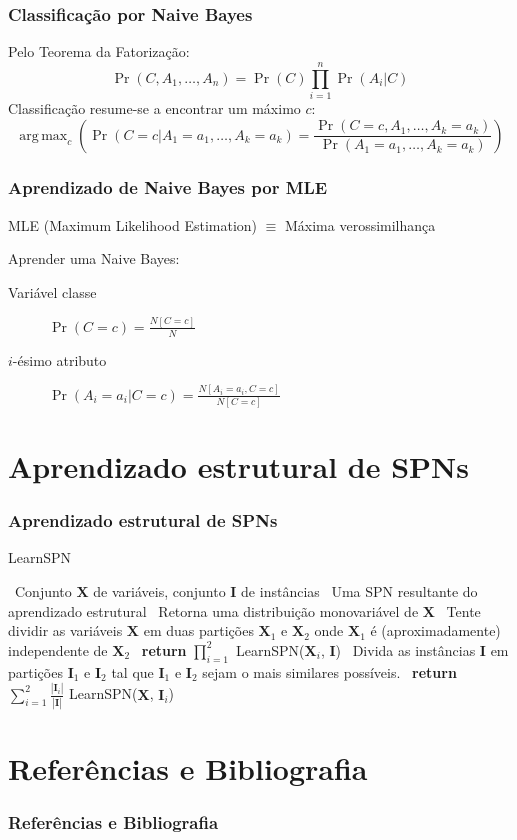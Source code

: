 \documentclass[10pt]{beamer}
\DeclareMathOperator*{\argmax}{arg\,max}
\theoremstyle{plain}
\newcommand{\set}[1]{\mathbf{#1}}
\begin{document}
\begin{frame}
  \frametitle{Classificação por Naive Bayes}
  Pelo Teorema da Fatorização:
  \begin{equation*}
    \Pr(C,A_1,\ldots,A_n)=\Pr(C)\prod_{i=1}^n \Pr(A_i|C)
  \end{equation*}
  Classificação resume-se a encontrar um máximo $c$:
  \begin{equation*}
    \argmax_c\left(\Pr(C=c|A_1=a_1,\ldots,A_k=a_k)=\frac{\Pr(C=c,A_1,\ldots,A_k=a_k)}{\Pr(A_1=a_1,
    \ldots,A_k=a_k)}\right)
  \end{equation*}
\end{frame}

\begin{frame}
  \frametitle{Aprendizado de Naive Bayes por MLE}
  MLE (Maximum Likelihood Estimation) $\equiv$ Máxima verossimilhança

  Aprender uma Naive Bayes:
  \begin{description}
    \item[Variável classe] $\Pr(C=c)=\frac{N[C=c]}{N}$
    \item[$i$-ésimo atributo] $\Pr(A_i=a_i|C=c)=\frac{N[A_i=a_i,C=c]}{N[C=c]}$
  \end{description}
\end{frame}


\section{Aprendizado estrutural de SPNs}

\begin{frame}
  \frametitle{Aprendizado estrutural de SPNs}
  \begin{algorithm}[H]
    \caption{LearnSPN~\cite{gens-domingos}}\label{learn-alg}
    \begin{algorithmic}[1]
      \Require~Conjunto $\set{X}$ de variáveis, conjunto $\set{I}$ de instâncias
      \Ensure~Uma SPN resultante do aprendizado estrutural
      \If{$|\set{X}|=1$}
        \State~Retorna uma distribuição monovariável de $\set{X}$
      \EndIf
      \State~Tente dividir as variáveis $\set{X}$ em duas partições $\set{X}_1$ e $\set{X}_2$ onde
        $\set{X}_1$ é (aproximadamente) independente de $\set{X}_2$
        \State~\textbf{return} $\prod_{i=1}^2$ LearnSPN($\set{X}_i$, $\set{I}$)
      \Else
        \State~Divida as instâncias $\set{I}$ em partições $\set{I}_1$ e $\set{I}_2$ tal que
          $\set{I}_1$ e $\set{I}_2$ sejam o mais similares possíveis.
        \State~\textbf{return} $\sum_{i=1}^2 \frac{|\set{I}_i|}{|\set{I}|}$ LearnSPN($\set{X}$,
          $\set{I}_i$)
      \EndIf
    \end{algorithmic}
  \end{algorithm}
\end{frame}


\section[Referências]{Referências e Bibliografia}
\begin{frame}[t,allowframebreaks]
  \frametitle{Referências e Bibliografia}
  \footnotesize
  \printbibliography[]
\end{frame}
\end{document}
